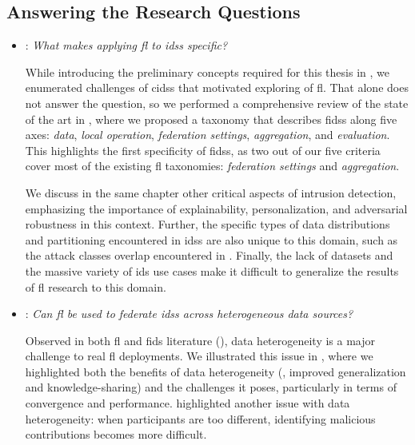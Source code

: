 \subsection{Answering the Research Questions\label{sec:conclusion.contribs.answers}}

\begin{itemize}[listparindent=\parindent,itemsep=.6\baselineskip]

  \item {}: \emph{What makes applying \gls{fl} to \glspl{ids} specific?}

  While introducing the preliminary concepts required for this thesis in , we enumerated challenges of \glspl{cids} that motivated exploring of \gls{fl}.
  That alone does not answer the question, so we performed a comprehensive review of the state of the art in , where we proposed a taxonomy that describes \glspl{fids} along five axes: \emph{data}, \emph{local operation}, \emph{federation settings}, \emph{aggregation}, and \emph{evaluation}.
  This highlights the first specificity of \glspl{fids}, as two out of our five criteria cover most of the existing \gls{fl} taxonomies: \emph{federation settings} and \emph{aggregation}.
  
  We discuss in the same chapter other critical aspects of intrusion detection, emphasizing the importance of explainability, personalization, and adversarial robustness in this context.
  Further, the specific types of data distributions and partitioning encountered in \glspl{ids} are also unique to this domain, such as the attack classes overlap encountered in .
  Finally, the lack of datasets and the massive variety of \gls{ids} use cases make it difficult to generalize the results of \gls{fl} research to this domain.
  

  \item {}: \emph{Can \gls{fl} be used to federate \glspl{ids} across heterogeneous data sources?}
  
  Observed in both \gls{fl} and \gls{fids} literature (\cf {}), data heterogeneity is a major challenge to real \gls{fl} deployments.
  We illustrated this issue in , where we highlighted both the benefits of data heterogeneity (\eg, improved generalization and knowledge-sharing) and the challenges it poses, particularly in terms of convergence and performance.
   highlighted another issue with data heterogeneity: when participants are too different, identifying malicious contributions becomes more difficult.


\end{itemize}
